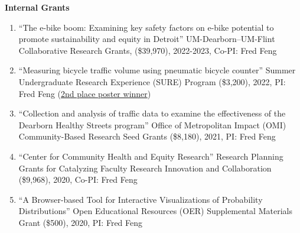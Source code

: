 \documentclass[11pt]{article}
\newenvironment{main}
{\begin{adjustwidth}{3em}{}}
{\end{adjustwidth}}
\begin{document}
\begin{main}
\textbf{Internal Grants}
\begin{enumerate}
    \item ``The e-bike boom: Examining key safety factors on e-bike potential to promote sustainability and equity in Detroit''
            UM-Dearborn–UM-Flint Collaborative Research Grants, (\$39,970), 2022-2023, Co-PI: Fred Feng
    \item ``Measuring bicycle traffic volume using pneumatic bicycle counter''
           Summer Undergraduate Research Experience (SURE) Program (\$3,200), 2022, PI: Fred Feng 
           (\href{https://umdearborn.edu/academics/undergraduate-studies/undergraduate-research/sure-program}{2nd place poster winner})
    \item ``Collection and analysis of traffic data to examine the effectiveness of the Dearborn Healthy Streets program''
          Office of Metropolitan Impact (OMI) Community-Based Research Seed Grants (\$8,180), 2021, PI: Fred Feng
    \item ``Center for Community Health and Equity Research'' 
         Research Planning Grants for Catalyzing Faculty Research Innovation and Collaboration (\$9,968), 2020, Co-PI: Fred Feng
    \item ``A Browser-based Tool for Interactive Visualizations of Probability Distributions''
        Open Educational Resources (OER) Supplemental Materials Grant (\$500), 2020, PI: Fred Feng

\end{enumerate}





\end{main}
\end{document}
